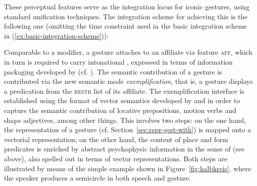 \documentclass[output=paper
 	        ,biblatex
                ,babelshorthands
                ,newtxmath
                ,draftmode
                ,colorlinks, citecolor=brown
]{langscibook}
\begin{document}
%
These perceptual features serve as the integration locus for iconic gestures, using standard unification techniques. 
%
The integration scheme for achieving this is the following one \citep[]{Luecking:2013:a} (omitting the time constraint used in the basic integration scheme in (\ref{ex:basic-integration-scheme})):
%
\ea \label{ex:sg-ensemble}
\z

\noindent Comparable to a modifier, a gesture attaches to an affiliate via feature \textsc{aff},  which in turn is required to carry intonational , expressed in terms of information packaging developed by \cite{Engdahl:Vallduvi:1996} (cf. ).
%
The semantic contribution of a gesture is contributed via the new semantic mode  \textit{exemplification}, that is, a gesture displays a predication from the \textsc{restr} list of its affiliate.
%
The exemplification interface is established using the format of vector semantics developed by \citet{Zwarts:Winter:2000} and \citet{Zwarts:2003} in order to capture the semantic contribution of locative prepositions, motion verbs and shape adjectives, among other things.
%
This involves two steps: on the one hand, the representation of a gesture (cf. Section~\ref{sec:repr-gest-with}) is mapped onto a vectorial representation; on the other hand, the content of place and form predicates is enriched by abstract psychophysic information in the sense of \citet{Johansson:1973} (see above), also spelled out in terms of vector representations.
%
Both steps are illustrated by means of the simple example shown in Figure~\ref{fig:halbkreis}, where the speaker produces a semicircle in both speech and gesture.
\end{document}
